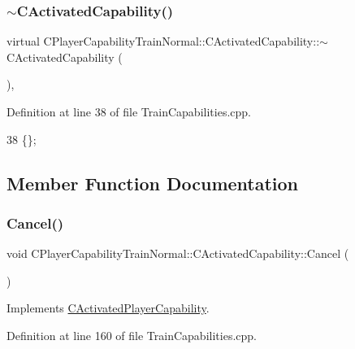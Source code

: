 \subsubsection{\texorpdfstring{$\sim$\+C\+Activated\+Capability()}{~CActivatedCapability()}}
{\footnotesize\ttfamily virtual C\+Player\+Capability\+Train\+Normal\+::\+C\+Activated\+Capability\+::$\sim$\+C\+Activated\+Capability (\begin{DoxyParamCaption}{ }\end{DoxyParamCaption})\hspace{0.3cm}{\ttfamily [inline]}, {\ttfamily [virtual]}}



Definition at line 38 of file Train\+Capabilities.\+cpp.


\begin{DoxyCode}
38 \{\};
\end{DoxyCode}


\subsection{Member Function Documentation}
\hypertarget{classCPlayerCapabilityTrainNormal_1_1CActivatedCapability_a028dc1f8c528cc726737d712f0236884}{}\label{classCPlayerCapabilityTrainNormal_1_1CActivatedCapability_a028dc1f8c528cc726737d712f0236884} 
\subsubsection{\texorpdfstring{Cancel()}{Cancel()}}
{\footnotesize\ttfamily void C\+Player\+Capability\+Train\+Normal\+::\+C\+Activated\+Capability\+::\+Cancel (\begin{DoxyParamCaption}{ }\end{DoxyParamCaption})\hspace{0.3cm}{\ttfamily [virtual]}}



Implements \hyperlink{classCActivatedPlayerCapability_a5cde83be468e262ad054d81e28684a81}{C\+Activated\+Player\+Capability}.



Definition at line 160 of file Train\+Capabilities.\+cpp.



